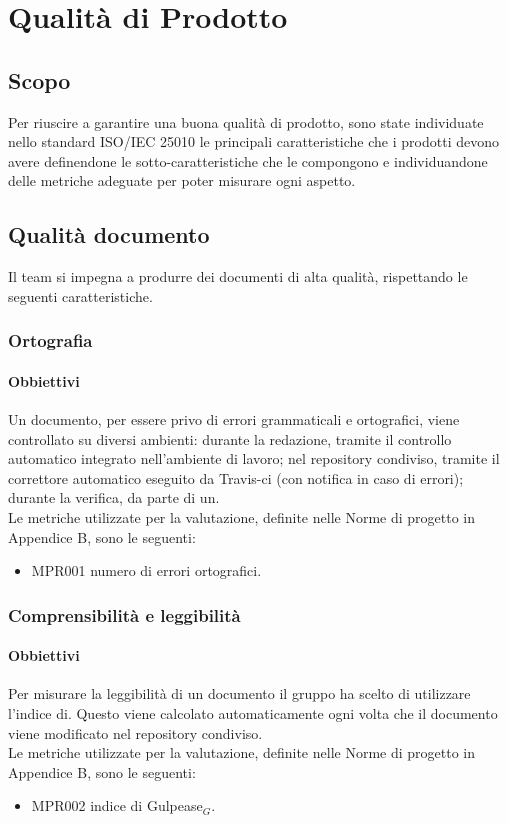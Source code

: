 \chapter{Qualità di Prodotto}
\label{prodotto}
\section{Scopo}
Per riuscire a garantire una buona qualità di prodotto, sono state individuate nello standard ISO/IEC 25010 le principali caratteristiche che i prodotti devono avere definendone le sotto-caratteristiche che le compongono e individuandone delle metriche adeguate per poter misurare ogni aspetto.

\section{Qualità documento}
\label{documento}
Il team si impegna a produrre dei documenti di alta qualità, rispettando le seguenti caratteristiche.
\subsection{Ortografia}
\subsubsection{Obbiettivi}
Un documento, per essere privo di errori grammaticali e ortografici, viene controllato su diversi ambienti: durante la redazione, tramite il controllo automatico integrato nell'ambiente di lavoro; nel repository condiviso, tramite il correttore automatico eseguito da Travis-ci (con notifica in caso di errori); durante la verifica, da parte di un.\\
Le metriche utilizzate per la valutazione, definite nelle Norme di progetto in Appendice B, sono le seguenti:
\begin{itemize}
    \item MPR001 numero di errori ortografici.
\end{itemize}
\subsection{Comprensibilità e leggibilità}
\subsubsection{Obbiettivi}
Per misurare la leggibilità di un documento il gruppo ha scelto di utilizzare l'indice di. Questo viene calcolato automaticamente ogni volta che il documento viene modificato nel repository condiviso.\\
Le metriche utilizzate per la valutazione, definite nelle Norme di progetto in Appendice B, sono le seguenti:
\begin{itemize}
    \item MPR002 indice di Gulpease$_{G}$.
\end{itemize}
